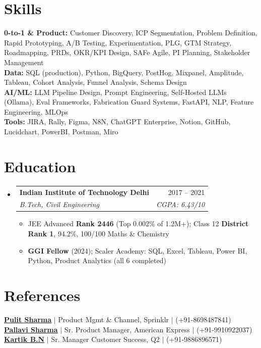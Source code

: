 \documentclass[a4paper,10pt]{article}
\makeatletter
\newcommand{\resumeItem}[1]{
  \item\small{#1\vspace{-2pt}}
}
\newcommand{\resumeSubheading}[4]{
  \vspace{-2pt}\item
  \begin{tabular*}{0.97\textwidth}[t]{l@{\extracolsep{\fill}}r}
    \textbf{#1} & #2 \\
    \textit{\small#3} & \textit{\small #4} \\
  \end{tabular*}\vspace{-7pt}
}
\newcommand{\resumeSubHeadingListStart}{\begin{itemize}[leftmargin=0.15in, label={}]}
\newcommand{\resumeSubHeadingListEnd}{\end{itemize}}
\newcommand{\resumeItemListStart}{\begin{itemize}\parfillskip=0pt}
\newcommand{\resumeItemListEnd}{\end{itemize}\vspace{-5pt}}
\makeatother
\begin{document}
\section{Skills}
\begin{itemize}[leftmargin=0.15in, label={}]
  \small{\item{
    \textbf{0-to-1 \& Product:}{ Customer Discovery, ICP Segmentation, Problem Definition, Rapid Prototyping, A/B Testing, Experimentation, PLG, GTM Strategy, Roadmapping, PRDs, OKR/KPI Design, SAFe Agile, PI Planning, Stakeholder Management} \\
    \textbf{Data:}{ SQL (production), Python, BigQuery, PostHog, Mixpanel, Amplitude, Tableau, Cohort Analysis, Funnel Analysis, Schema Design} \\
    \textbf{AI/ML:}{ LLM Pipeline Design, Prompt Engineering, Self-Hosted LLMs (Ollama), Eval Frameworks, Fabrication Guard Systems, FastAPI, NLP, Feature Engineering, MLOps} \\
    \textbf{Tools:}{ JIRA, Rally, Figma, N8N, ChatGPT Enterprise, Notion, GitHub, Lucidchart, PowerBI, Postman, Miro}
  }}
\end{itemize}

\section{Education}
\resumeSubHeadingListStart
  \resumeSubheading
    {Indian Institute of Technology Delhi}{2017 -- 2021}
    {B.Tech, Civil Engineering}{CGPA: 6.43/10}
  \resumeItemListStart
    \resumeItem{JEE Advanced \textbf{Rank 2446} (Top 0.002\% of 1.2M+); Class 12 \textbf{District Rank 1}, 94.2\%, 100/100 Maths \& Chemistry}
    \resumeItem{\textbf{GGI Fellow} (2024); Scaler Academy: SQL, Excel, Tableau, Power BI, Python, Product Analytics (all 6 completed)}
  \resumeItemListEnd
\resumeSubHeadingListEnd

\vspace{-6pt}
\section{References}
\begin{itemize}[leftmargin=0.15in, label={}]
  \small{\item{
    \href{https://linkedin.com/in/pulit-sharma-36426349}{\textbf{\underline{Pulit Sharma}}} $|$ Product Mgmt \& Channel, Sprinklr $|$ (+91-8698487841) \\
    \href{https://linkedin.com/in/pallavi-sharma-54088159}{\textbf{\underline{Pallavi Sharma}}} $|$ Sr. Product Manager, American Express $|$ (+91-9910922037) \\
    \href{https://linkedin.com/in/kartik-bn-3770807b}{\textbf{\underline{Kartik B.N}}} $|$ Sr. Manager Customer Success, Q2 $|$ (+91-9886896571)
  }}
\end{itemize}
\end{document}

